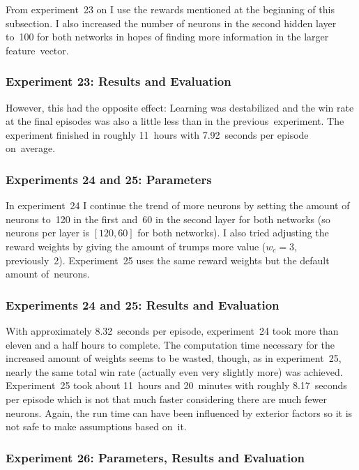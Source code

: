 \documentclass[a4paper,titlepage]{article}
\begin{document}
From experiment~23 on I use the rewards mentioned at the beginning of this subsection. I also increased the number of neurons in the second hidden layer to~100 for both networks in hopes of finding more information in the larger feature~vector.

\subsubsection*{Experiment 23: Results and Evaluation}

However, this had the opposite effect: Learning was destabilized and the win rate at the final episodes was also a little less than in the previous~experiment. The experiment finished in roughly 11~hours with 7.92~seconds per episode on~average.

\subsubsection*{Experiments 24 and 25: Parameters}

In experiment~24 I continue the trend of more neurons by setting the amount of neurons to~120 in the first and~60 in the second layer for both networks (so neurons per layer is $[120, 60]$ for both networks). I also tried adjusting the reward weights by giving the amount of trumps more value ($w_c = 3$, previously~2). Experiment~25 uses the same reward weights but the default amount of~neurons.

\subsubsection*{Experiments 24 and 25: Results and Evaluation}

With approximately 8.32~seconds per episode, experiment~24 took more than eleven and a half hours to complete. The computation time necessary for the increased amount of weights seems to be wasted, though, as in experiment~25, nearly the same total win rate (actually even very slightly more) was achieved. Experiment~25 took about 11~hours and 20~minutes with roughly 8.17~seconds per episode which is not that much faster considering there are much fewer neurons. Again, the run time can have been influenced by exterior factors so it is not safe to make assumptions based on~it.

\subsubsection*{Experiment 26: Parameters, Results and Evaluation}
\end{document}
